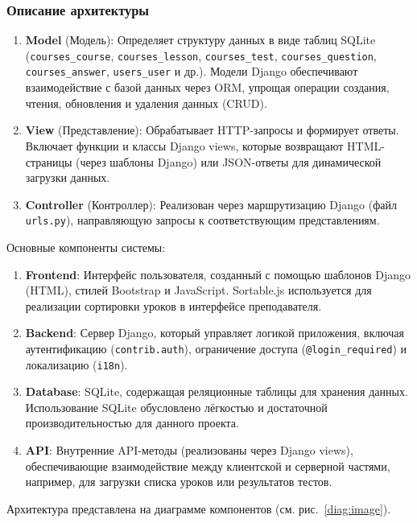 \subsubsection{Описание архитектуры}

\begin{enumerate}
	\item \textbf{Model} (Модель): Определяет структуру данных в виде таблиц SQLite (\texttt{courses\_course}, \texttt{courses\_lesson}, \texttt{courses\_test}, \texttt{courses\_question}, \texttt{courses\_answer}, \texttt{users\_user} и др.). Модели Django обеспечивают взаимодействие с базой данных через ORM, упрощая операции создания, чтения, обновления и удаления данных (CRUD).
	\item \textbf{View} (Представление): Обрабатывает HTTP-запросы и формирует ответы. Включает функции и классы Django views, которые возвращают HTML-страницы (через шаблоны Django) или JSON-ответы для динамической загрузки данных.
	\item \textbf{Controller} (Контроллер): Реализован через маршрутизацию Django (файл \texttt{urls.py}), направляющую запросы к соответствующим представлениям.
\end{enumerate}

Основные компоненты системы:
\begin{enumerate}
	\item \textbf{Frontend}: Интерфейс пользователя, созданный с помощью шаблонов Django (HTML), стилей Bootstrap и JavaScript. Sortable.js используется для реализации сортировки уроков в интерфейсе преподавателя.
	\item \textbf{Backend}: Сервер Django, который управляет логикой приложения, включая аутентификацию (\texttt{contrib.auth}), ограничение доступа (\texttt{@login\_required}) и локализацию (\texttt{i18n}).
	\item \textbf{Database}: SQLite, содержащая реляционные таблицы для хранения данных. Использование SQLite обусловлено лёгкостью и достаточной производительностью для данного проекта.
	\item \textbf{API}: Внутренние API-методы (реализованы через Django views), обеспечивающие взаимодействие между клиентской и серверной частями, например, для загрузки списка уроков или результатов тестов.
\end{enumerate}

Архитектура представлена на диаграмме компонентов (см. рис.~\ref{diag:image}).

